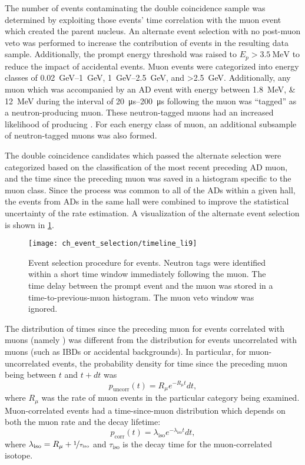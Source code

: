 The number of \li{} events contaminating the double coincidence sample
was determined by exploiting those events' time correlation
with the muon event which created the parent \li{} nucleus.
An alternate event selection with no post-muon veto
was performed to increase the contribution of \li{} events
in the resulting data sample.
Additionally, the prompt energy threshold
was raised to $E_p > \SI{3.5}{\MeV}$
to reduce the impact of accidental events.
Muon events were categorized into energy classes
of \SIrange{0.02}{1}{\GeV}, \SIrange{1}{2.5}{\GeV},
and \SI{>2.5}{\GeV}.
Additionally, any muon which was accompanied by
an AD event with energy between \SIlist{1.8;12}{\MeV}
during the interval of \SIrange{20}{200}{\us} following the muon
was ``tagged'' as a neutron-producing muon.
These neutron-tagged muons had an increased likelihood
of producing \li{}.
For each energy class of muon,
an additional subsample of neutron-tagged muons was also formed.

The double coincidence candidates which passed the alternate selection
were categorized based on the classification
of the most recent preceding AD muon,
and the time since the preceding muon
was saved in a histogram specific to the muon class.
Since the \li{} process was common to all of the ADs within a given hall,
the events from ADs in the same hall were combined
to improve the statistical uncertainty of the rate estimation.
A visualization of the alternate event selection
is shown in \cref{fig:li9_timeline}.

\begin{figure}
    \texttt{[image: ch\_event\_selection/timeline\_li9]}
    \caption{
        Event selection procedure for \li{} events.
        Neutron tags were identified within a short time window
        immediately following the muon.
        The time delay between the prompt event and the muon
        was stored in a time-to-previous-muon histogram.
        The muon veto window was ignored.
    }
    \label{fig:li9_timeline}
\end{figure}

The distribution of times since the preceding muon
for events correlated with muons (namely \li{})
was different from the distribution for events uncorrelated with muons
(such as IBDs or accidental backgrounds).
In particular, for muon-uncorrelated events,
the probability density for time since the preceding muon
being between $t$ and $t + dt$ was
\begin{equation}\label{eq:li9_muon_uncorr}
    p_\text{uncorr}(t) = R_\mu e^{-R_\mu t}dt,
\end{equation}
where $R_\mu$ was the rate of muon events in the particular category being examined.
Muon-correlated events had a time-since-muon distribution
which depends on both the muon rate and the decay lifetime:
\begin{equation}\label{eq:li9_muon_corr}
    p_\text{corr}(t) = \lambda_\text{iso} e^{-\lambda_\text{iso} t}dt,
\end{equation}
where $\lambda_\text{iso} = R_\mu + \nicefrac{1}{\tau_\text{iso}}$
and $\tau_\text{iso}$ is the decay time
for the muon-correlated isotope.

